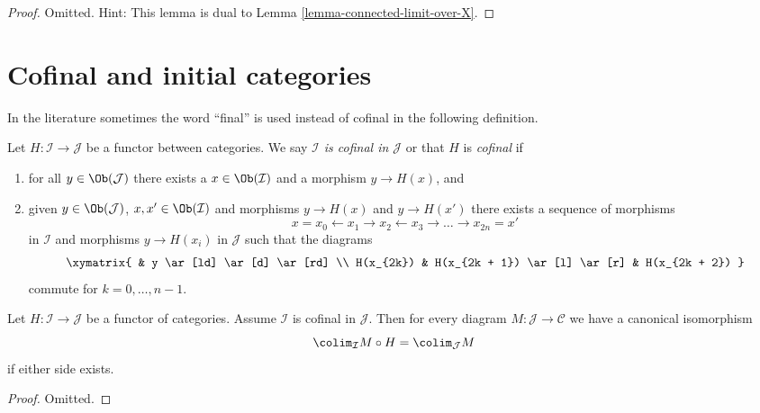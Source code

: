 \begin{proof}
Omitted. Hint: This lemma is dual to Lemma \ref{lemma-connected-limit-over-X}.
\end{proof}




\section{Cofinal and initial categories}
\label{section-cofinal}

\noindent
In the literature sometimes the word ``final'' is used instead of cofinal
in the following definition.

\begin{definition}
\label{definition-cofinal}
Let $H : \mathcal{I} \to \mathcal{J}$ be a functor between categories.
We say {\it $\mathcal{I}$ is cofinal in $\mathcal{J}$} or that
$H$ is {\it cofinal} if
\begin{enumerate}
\item for all $y \in \Ob(\mathcal{J})$ there exists a
$x \in \Ob(\mathcal{I})$ and a morphism $y \to H(x)$, and
\item given $y \in \Ob(\mathcal{J})$, $x, x' \in \Ob(\mathcal{I})$
and morphisms $y \to H(x)$ and $y \to H(x')$ there exists a sequence
of morphisms
$$
x = x_0 \leftarrow x_1 \rightarrow x_2 \leftarrow x_3 \rightarrow \ldots
\rightarrow x_{2n} = x'
$$
in $\mathcal{I}$ and morphisms $y \to H(x_i)$ in $\mathcal{J}$
such that the diagrams
$$
\xymatrix{
& y \ar[ld] \ar[d] \ar[rd] \\
H(x_{2k}) & H(x_{2k + 1}) \ar[l] \ar[r] & H(x_{2k + 2})
}
$$
commute for $k = 0, \ldots, n - 1$.
\end{enumerate}
\end{definition}

\begin{lemma}
\label{lemma-cofinal}
Let $H : \mathcal{I} \to \mathcal{J}$ be a functor of categories. Assume
$\mathcal{I}$ is cofinal in $\mathcal{J}$. Then for every diagram
$M : \mathcal{J} \to \mathcal{C}$ we have a canonical isomorphism
$$
\colim_\mathcal{I} M \circ H
=
\colim_\mathcal{J} M
$$
if either side exists.
\end{lemma}

\begin{proof}
Omitted.
\end{proof}

